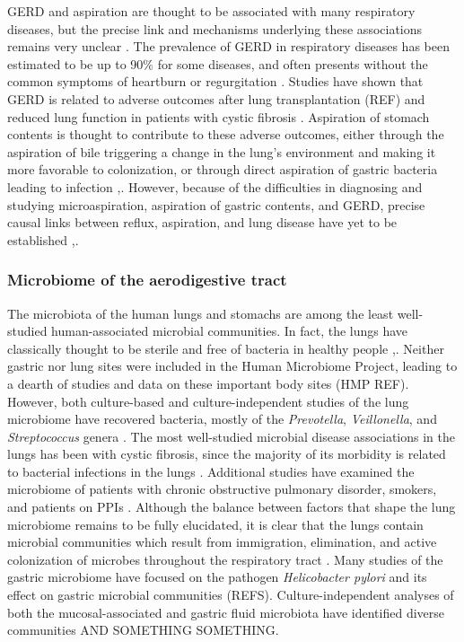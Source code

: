 \documentclass[12pt]{article}
\begin{document}
GERD and aspiration are thought to be associated with many respiratory diseases, but the precise 
link and mechanisms underlying these associations remains very unclear 
\cite{houghton-microaspiration-2016}. The prevalence of GERD in 
respiratory diseases has been estimated to be up to 90\% for some 
diseases, and often presents without the common symptoms of heartburn 
or regurgitation \cite{houghton-microaspiration-2016}. Studies have 
shown that GERD is related to adverse outcomes after lung 
transplantation (REF) and reduced lung function in patients with 
cystic fibrosis \cite{almomani-cf_sputum-2016}. Aspiration of stomach 
contents is thought to contribute to these adverse outcomes, either 
through the aspiration of bile triggering a change in the lung's 
environment and making it more favorable to colonization, or through 
direct aspiration of gastric bacteria leading to infection 
\cite{almomani-cf_sputum-2016},\cite{reen-aspirated_bile-2014}. 
However, because of the difficulties in diagnosing and studying 
microaspiration, aspiration of gastric contents, and GERD, precise 
causal links between reflux, aspiration, and lung disease have yet to 
be established \cite{almomani-cf_sputum-2016},\cite{houghton-microaspiration-2016}.

\subsubsection{Microbiome of the aerodigestive tract}
The microbiota of the human lungs and stomachs are among the least 
well-studied human-associated microbial communities. In fact, the 
lungs have classically thought to be sterile and free of bacteria in 
healthy people \cite{charslon-topographical-2011},\cite{bassis-source-2015}. 
Neither gastric nor lung sites were included in the 
Human Microbiome Project, leading to a dearth of studies and data on 
these important body sites (HMP REF). However, both culture-based
and culture-independent studies of the lung microbiome have recovered
bacteria, mostly of the \textit{Prevotella}, \textit{Veillonella}, and \textit{Streptococcus} genera \cite{bassis-source-2015}. The most well-studied
microbial disease associations in the lungs has been with cystic fibrosis,
since the majority of its morbidity is related to bacterial infections
in the lungs \cite{almomani-cf_sputum-2016}. Additional studies have
examined the microbiome of patients with chronic obstructive 
pulmonary disorder, smokers, and patients on PPIs \cite{erbdownward-copd-2011}.
Although the balance between factors that shape the lung microbiome 
remains to be fully elucidated, it is clear that the lungs
contain microbial communities which result from
immigration, elimination, and active colonization of microbes 
throughout the respiratory tract \cite{bassis-source-2015}.
Many studies of the gastric microbiome have focused
on the pathogen \textit{Helicobacter pylori} and its effect on  
gastric microbial communities (REFS). Culture-independent analyses 
of both the mucosal-associated and gastric fluid microbiota
have identified diverse communities AND SOMETHING SOMETHING.
\end{document}

